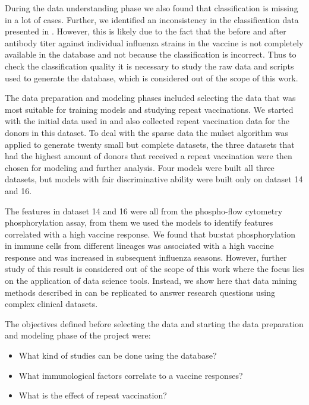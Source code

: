 During the data understanding phase we also found that classification is missing in a lot of cases.
Further, we identified an inconsistency in the classification data presented in \flup.
However, this is likely due to the fact that the before and after antibody titer against individual influenza strains in the vaccine is not completely available in the database and not because the classification is incorrect.
Thus to check the classification quality it is necessary to study the raw data and scripts used to generate the database, which is considered out of the scope of this work.

The data preparation and modeling phases included selecting the data that was most suitable for training models and studying repeat vaccinations.
We started with the initial data used in \spaper and also collected repeat vaccination data for the donors in this dataset.
To deal with the sparse data the mulset algorithm was applied to generate twenty small but complete datasets, the three datasets that had the highest amount of donors that received a repeat vaccination were then chosen for modeling and further analysis.
Four models were built all three datasets, but models with fair discriminative ability were built only on dataset 14 and 16.

The features in dataset 14 and 16 were all from the phospho-flow cytometry phosphorylation assay, from them we used the models to identify features correlated with a high vaccine response.
We found that \gls{bu:stat} phosphorylation in immune cells from different lineages was associated with a high vaccine response and was increased in subsequent influenza seasons.
However, further study of this result is considered out of the scope of this work where the focus lies on the application of data science tools.
Instead, we show here that data mining methods described in \spaper can be replicated to answer research questions using complex clinical datasets.

The objectives defined before selecting the data and starting the data preparation and modeling phase of the project were:
\begin{itemize}
        \item What kind of studies can be done using the \flup database?
        \item What immunological factors correlate to a vaccine responses?
        \item What is the effect of repeat vaccination?
\end{itemize}


